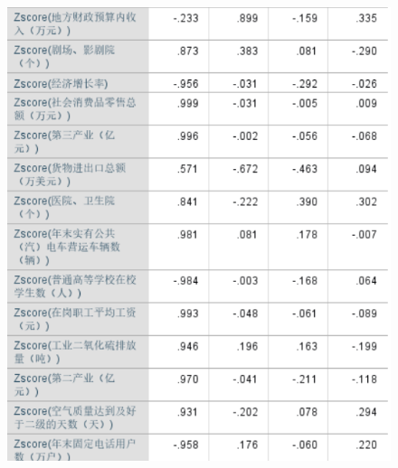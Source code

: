 \documentclass{whutmod}
\begin{document}
	\begin{figure}[H]
	\centering
	\includegraphics[width=\textwidth]{figures/2.png}

\end{figure} 
\end{document}
